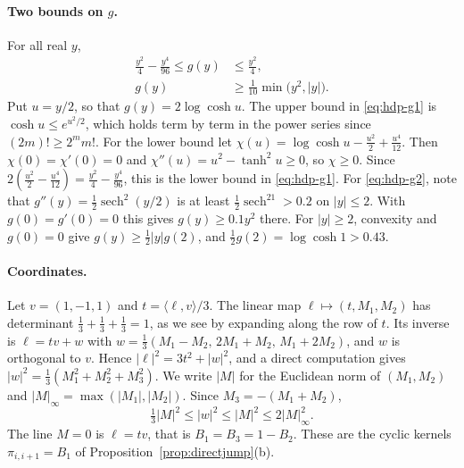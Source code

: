 \paragraph{Two bounds on $g$.}
For all real $y$,
\begin{align}
 \frac{y^2}4-\frac{y^4}{96}\le g(y)&\le\frac{y^2}4,
 \tag{g1}\label{eq:hdp-g1}\\
 g(y)&\ge\frac1{10}\min\bigl(y^2,\lvert y\rvert\bigr).
 \tag{g2}\label{eq:hdp-g2}
\end{align}
Put $u=y/2$, so that $g(y)=2\log\cosh u$. The upper bound in
\eqref{eq:hdp-g1} is $\cosh u\le e^{u^2/2}$, which holds term by term in the
power series since $(2m)!\ge2^mm!$. For the lower bound let
$\chi(u)=\log\cosh u-\frac{u^2}2+\frac{u^4}{12}$. Then $\chi(0)=\chi'(0)=0$
and $\chi''(u)=u^2-\tanh^2u\ge0$, so $\chi\ge0$. Since
$2(\frac{u^2}2-\frac{u^4}{12})=\frac{y^2}4-\frac{y^4}{96}$, this is the lower
bound in \eqref{eq:hdp-g1}. For \eqref{eq:hdp-g2}, note that
$g''(y)=\frac12\operatorname{sech}^2(y/2)$ is at least
$\frac12\operatorname{sech}^21>0.2$ on $\lvert y\rvert\le2$. With
$g(0)=g'(0)=0$ this gives $g(y)\ge0.1y^2$ there. For $\lvert y\rvert\ge2$,
convexity and $g(0)=0$ give $g(y)\ge\frac12\lvert y\rvert g(2)$, and
$\frac12g(2)=\log\cosh1>0.43$.

\paragraph{Coordinates.}
Let $v=(1,-1,1)$ and $t=\langle\ell,v\rangle/3$. The linear map
$\ell\mapsto(t,M_1,M_2)$ has determinant $\frac13+\frac13+\frac13=1$, as we
see by expanding along the row of $t$. Its inverse is $\ell=tv+w$ with
$w=\frac13(M_1-M_2,\,2M_1+M_2,\,M_1+2M_2)$, and $w$ is orthogonal to $v$.
Hence $\lvert\ell\rvert^2=3t^2+\lvert w\rvert^2$, and a direct computation
gives $\lvert w\rvert^2=\frac13(M_1^2+M_2^2+M_3^2)$. We write $\lvert M\rvert$ for
the Euclidean norm of $(M_1,M_2)$ and
$\lvert M\rvert_\infty=\max(\lvert M_1\rvert,\lvert M_2\rvert)$. Since
$M_3=-(M_1+M_2)$,
\begin{equation}\label{eq:hdp-w}
 \tfrac13\lvert M\rvert^2\le\lvert w\rvert^2\le\lvert M\rvert^2
 \le2\lvert M\rvert_\infty^2 .
\end{equation}
The line $M=0$ is $\ell=tv$, that is $B_1=B_3=1-B_2$. These are the cyclic
kernels $\pi_{i,i+1}=B_1$ of Proposition~\ref{prop:directjump}(b).

